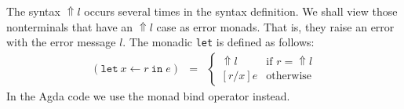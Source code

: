 \documentclass[runningheads]{llncs}
\newcommand{\error}[1]{\ensuremath{\mathop{\Uparrow}#1}}
\newcommand{\mbind}[0]{\ensuremath{\;\gg=\;}}
\newcommand{\mlet}[3]{\ensuremath{
\mathtt{let}\ #1\leftarrow#2\ \mathtt{in}\;#3}}
\begin{document}
The syntax \error{l} occurs several times in the syntax definition. We shall 
view those nonterminals that have an \error{l} case as error monads.
That is, they raise an error with the error message $l$.
The monadic \texttt{let} is defined as follows:
\[
\begin{array}{rcll}
  (\mlet{x}{r}{e}) & = &
  \begin{cases}
    \error{l} & \text{if } r = \error{l} \\
    [r/x]e & \text{otherwise}
  \end{cases}
\end{array}
\]
In the Agda code we use the monad bind operator instead.
\end{document}
